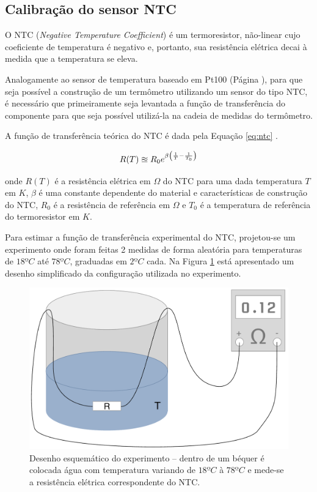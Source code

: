 \documentclass[a4paper]{instrumentacao}
\begin{document}
\subsection{Calibração do sensor NTC}
O NTC (\textit{Negative Temperature Coefficient}) é um termoresistor, não-linear cujo coeficiente de temperatura é negativo e, portanto, sua resistência elétrica decai à medida que a temperatura se eleva.

Analogamente ao sensor de temperatura baseado em Pt100 (Página \pageref{ch:pt100}), para que seja possível a construção de um termômetro utilizando um sensor do tipo NTC, é necessário que primeiramente seja levantada a função de transferência do componente para que seja possível utilizá-la na cadeia de medidas do termômetro.

A função de transferência teórica do NTC é dada pela Equação \ref{eq:ntc} \cite{livro-texto}.

\begin{equation}
	\large
	R(T) \approxeq R_0 e^{\beta\left(\frac{1}{T} - \frac{1}{T_0}\right)}
	\label{eq:ntc}
\end{equation}

\noindent
onde $R(T)$ é a resistência elétrica em $\Omega$ do NTC para uma dada temperatura $T$ em $K$, $\beta$ é uma constante dependente do material e características de construção do NTC, $R_0$ é a resistência de referência em $\Omega$ e $T_0$ é a temperatura de referência do termoresistor em $K$.

Para estimar a função de transferência experimental do NTC, projetou-se um experimento onde foram feitas 2 medidas de forma aleatória para temperaturas de $18ºC$ até $78ºC$, graduadas em $2ºC$ cada. Na Figura \ref{fig:ntc-esquematico} está apresentado um desenho simplificado da configuração utilizada no experimento.

\begin{figure}[H]
\center
\includegraphics[width=\textwidth]{Bequer.pdf}
\caption{Desenho esquemático do experimento -- dentro de um béquer é colocada água com temperatura variando de $18ºC$ à $78ºC$ e mede-se a resistência elétrica correspondente do NTC.}
\label{fig:ntc-esquematico}
\end{figure}
\end{document}
